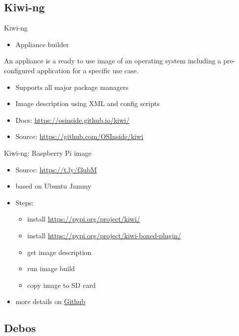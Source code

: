 \documentclass{beamer}
\begin{document}
\subsection{Kiwi-ng}

\begin{frame}{Kiwi-ng}
	\begin{itemize}
		\item Appliance builder
	\end{itemize}
	\begin{definition} 
		An appliance is a ready to use image of an operating system including a pre-configured application for a specific use case. 
	\end{definition}
	\begin{itemize}
		\item Supports all major package managers
		\item Image description using XML and config scripts
		\item Docs: \url{https://osinside.github.io/kiwi/}
		\item Source: \url{https://github.com/OSInside/kiwi}
	\end{itemize}
\end{frame}

\begin{frame}{Kiwi-ng: Raspberry Pi image}
	\begin{itemize}
		\item Source: \url{https://t.ly/f3ubM}
		\item based on Ubuntu Jammy
		\item Steps:
		\begin{itemize}
			\item install \url{https://pypi.org/project/kiwi/}
			\item install \url{https://pypi.org/project/kiwi-boxed-plugin/}
			\item get image description
			\item run image build
			\item copy image to SD card
		\end{itemize}
		\item more details on \href{https://github.com/tomirgang/eh21_maintainable_linux/tree/main/examples/first_build_rpi4/kiwi-ng}{Github}
	\end{itemize}
\end{frame}

\subsection{Debos}
\end{document}
